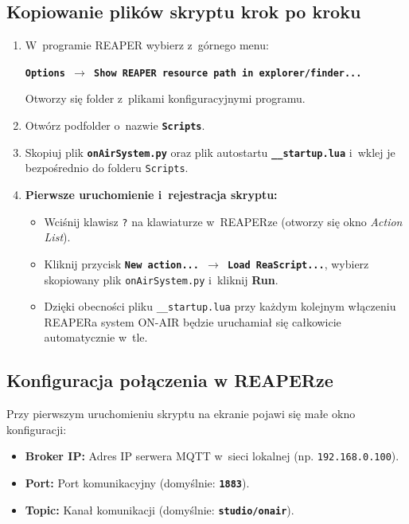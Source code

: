 \documentclass[11pt,a4paper]{article}
\begin{document}
\subsection{Kopiowanie plików skryptu krok po kroku}
\begin{enumerate}[leftmargin=1.5em]
    \item W~programie REAPER wybierz z~górnego menu:
    \begin{center}
        \textbf{\texttt{Options $\rightarrow$ Show REAPER resource path in explorer/finder...}}
    \end{center}
    Otworzy się folder z~plikami konfiguracyjnymi programu.
    
    \item Otwórz podfolder o~nazwie \textbf{\texttt{Scripts}}.
    \item Skopiuj plik \textbf{\texttt{onAirSystem.py}} oraz plik autostartu \textbf{\texttt{\_\_startup.lua}} i~wklej je bezpośrednio do folderu \texttt{Scripts}.
    \item \textbf{Pierwsze uruchomienie i~rejestracja skryptu:}
    \begin{itemize}
        \item Wciśnij klawisz \texttt{?} na klawiaturze w~REAPERze (otworzy się okno \textit{Action List}).
        \item Kliknij przycisk \textbf{\texttt{New action... $\rightarrow$ Load ReaScript...}}, wybierz skopiowany plik \texttt{onAirSystem.py} i~kliknij \textbf{Run}.
        \item Dzięki obecności pliku \texttt{\_\_startup.lua} przy każdym kolejnym włączeniu REAPERa system ON-AIR będzie uruchamiał się całkowicie automatycznie w~tle.
    \end{itemize}
\end{enumerate}

\subsection{Konfiguracja połączenia w REAPERze}
Przy pierwszym uruchomieniu skryptu na ekranie pojawi się małe okno konfiguracji:
\begin{itemize}[leftmargin=1.5em]
    \item \textbf{Broker IP:} Adres IP serwera MQTT w~sieci lokalnej (np. \texttt{192.168.0.100}).
    \item \textbf{Port:} Port komunikacyjny (domyślnie: \textbf{\texttt{1883}}).
    \item \textbf{Topic:} Kanał komunikacji (domyślnie: \textbf{\texttt{studio/onair}}).
\end{itemize}
\end{document}
